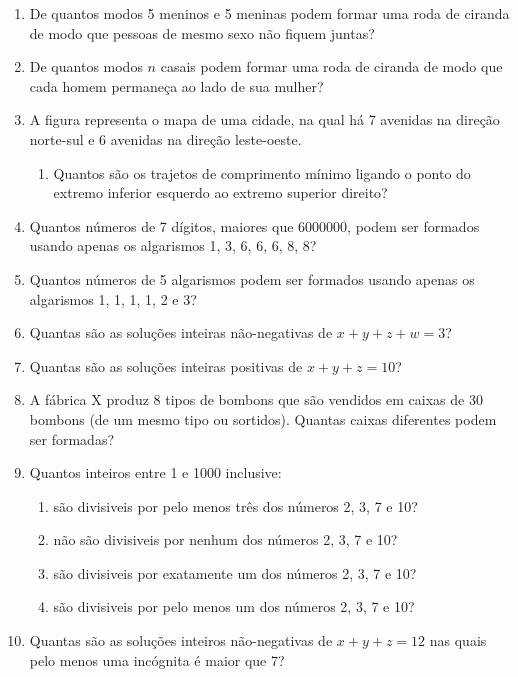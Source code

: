 \documentclass[a4paper,12pt]{letter}  %
\begin{document}
\begin{enumerate}
	\item De quantos modos 5 meninos e 5 meninas podem formar uma roda de ciranda de modo que pessoas de mesmo sexo não fiquem juntas?
	\item De quantos modos $n$ casais podem formar uma roda de ciranda de modo que cada homem permaneça ao lado de sua mulher?

	\item A figura representa o mapa de uma cidade, na qual há 7 avenidas na direção norte-sul e 6 avenidas na direção leste-oeste.
	\begin{enumerate}
        \item Quantos são os trajetos de comprimento mínimo ligando o ponto do extremo inferior esquerdo ao extremo superior direito?
    \end{enumerate}
	\item Quantos números de 7 dígitos, maiores que 6000000, podem ser formados usando apenas os algarismos 1, 3, 6, 6, 6, 8, 8?
	\item Quantos números de 5 algarismos podem ser formados usando apenas os algarismos 1, 1, 1, 1, 2 e 3?

	\item Quantas são as soluções inteiras não-negativas de $x+y+z+w=3$?
	\item Quantas são as soluções inteiras positivas de $x+y+z=10$?
	\item A fábrica X produz 8 tipos de bombons que são vendidos em caixas de 30 bombons (de um mesmo tipo ou sortidos). Quantas caixas diferentes podem ser formadas?

	\item Quantos inteiros entre 1 e 1000 inclusive:
	\begin{enumerate}
        \item são divisiveis por pelo menos três dos números 2, 3, 7 e 10?
        \item não são divisiveis por nenhum dos números 2, 3, 7 e 10?
        \item são divisiveis por exatamente um dos números 2, 3, 7 e 10?
        \item são divisiveis por pelo menos um dos números 2, 3, 7 e 10?
    \end{enumerate}
	\item Quantas são as soluções inteiros não-negativas de $x+y+z=12$ nas quais pelo menos uma incógnita é maior que 7?


\end{enumerate}
\end{document}
